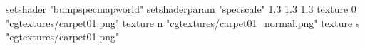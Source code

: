 setshader "bumpspecmapworld"
setshaderparam "specscale" 1.3 1.3 1.3
   texture 0 "cgtextures/carpet01.png"
   texture n "cgtextures/carpet01_normal.png"
   texture s "cgtextures/carpet01.png"